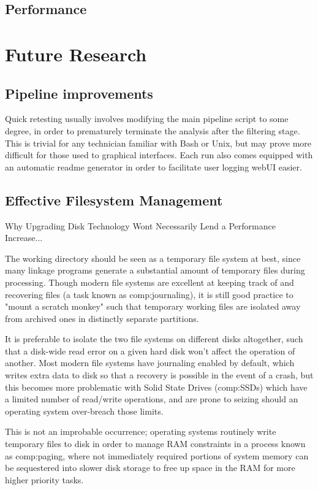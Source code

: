 \subsection{Performance}


\section{Future Research}


\subsection{Pipeline improvements}
Quick retesting usually involves modifying the main pipeline script to some degree, in order to prematurely terminate the analysis after the filtering stage. This is trivial for any technician familiar with Bash or Unix, but may prove more difficult for those used to graphical interfaces. Each run also comes equipped with an automatic readme generator in order to facilitate user logging webUI easier.


\subsection{Effective Filesystem Management}

Why Upgrading Disk Technology Wont Necessarily Lend a Performance Increase...

The working directory should be seen as a temporary file system at best, since many linkage programs generate a substantial amount of temporary files during processing. Though modern file systems are excellent at keeping track of and recovering files (a task known as \gls{comp:journaling}), it is still good practice to "mount a scratch monkey" such that temporary working files are isolated away from archived ones in distinctly separate partitions. 

It is preferable to isolate the two file systems on different disks altogether, such that a disk-wide read error on a given hard disk won't affect the operation of another. Most modern file systems have journaling enabled by default, which writes extra data to disk so that a recovery is possible in the event of a crash, but this becomes more problematic with Solid State Drives (\gls{comp:SSD}s) which have a limited number of read/write operations, and are prone to seizing should an operating system over-breach those limits.

This is not an improbable occurrence; operating systems routinely write temporary files to disk in order to manage RAM constraints in a process known as \gls{comp:paging}, where not immediately required portions of system memory can be sequestered into slower disk storage to free up space in the RAM for more higher priority tasks. 

